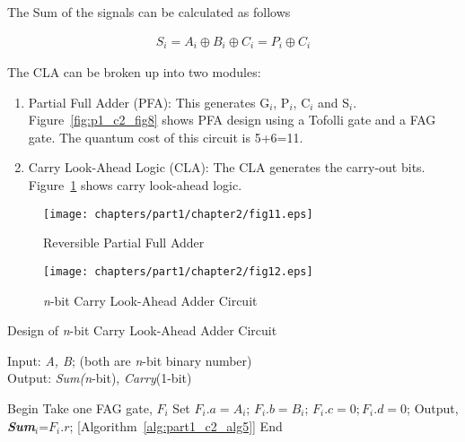 \noindent The Sum of the signals can be calculated as follows

\begin{align*}
{ S{}_{i} = A{}_{i}}{\oplus }{ B{}_{i}}{\oplus }{ C{}_{i} = P{}_{i}}{\oplus }{ C{}_{i}}
\end{align*}

The CLA can be broken up into two modules:
\begin{enumerate}
\item Partial Full Adder (PFA): This generates G${}_{i}$, P${}_{i}$, C${}_{i}$ and S${}_{i}$. Figure~\ref{fig:p1_c2_fig8} shows PFA design using a Tofolli gate and a FAG gate. The quantum cost of this circuit is 5+6=11.
\item Carry Look-Ahead Logic (CLA): The CLA generates the carry-out bits. Figure~\ref{fig:p1_c2_fig11} shows carry look-ahead logic.
\end{enumerate}

\begin{figure}[!tbh]
\centering
\texttt{[image: chapters/part1/chapter2/fig11.eps]}
\caption{Reversible Partial Full Adder}
\label{fig:p1_c2_fig11}
\end{figure}

\begin{figure}[!tbh]
\centering
\texttt{[image: chapters/part1/chapter2/fig12.eps]}
\caption{{\it n}-bit Carry Look-Ahead Adder Circuit}
\label{fig:p1_c2_fig12}
\end{figure}
\begin{algorithm}[!tbh]
\caption{Design of {\it n}-bit Carry Look-Ahead Adder Circuit}
\label{alg:part1_c2_alg4}
Input: { { \textit{A, B}; (both are \textit{n}-bit binary number)}}\\
Output: {{\textit{Sum(n}-bit), \textit{Carry}(1-bit)}}
\begin{algorithmic}[1]

\STATE Begin
\STATE Take one FAG gate, $F{}_{i}$
\STATE Set $F{}_{i}.a=A{}_{i}$; $F{}_{i}.b=B{}_{i}$; $F{}_{i}.c=0; F{}_{i}.d=0$;
\STATE Output, {\bf {\it Sum${}_{i}$}}=$F{}_{i}.r$;
\ENDFOR
{} [Algorithm~\ref{alg:part1_c2_alg5}]
\STATE End
\end{algorithmic}
\end{algorithm}



